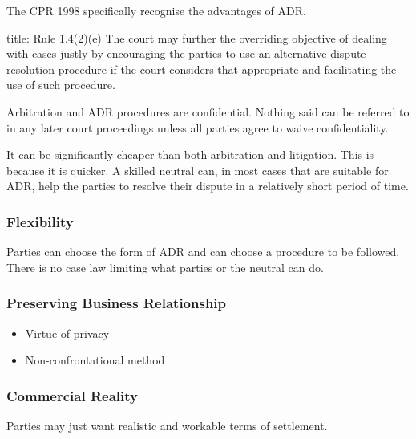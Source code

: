 \documentclass[
]{article}
\newenvironment{Shaded}{}{}
\newcommand{\NormalTok}[1]{#1}
\providecommand{\tightlist}{%
  \setlength{\itemsep}{0pt}\setlength{\parskip}{0pt}}
\begin{document}
The CPR 1998 specifically recognise the advantages of ADR.

\begin{Shaded}
\begin{Highlighting}[]
\NormalTok{title: Rule 1.4(2)(e)}
\NormalTok{The court may further the overriding objective of dealing with cases justly by encouraging the parties to use an alternative dispute resolution procedure if the court considers that appropriate and facilitating the use of such procedure.}
\end{Highlighting}
\end{Shaded}

Arbitration and ADR procedures are confidential. Nothing said can be
referred to in any later court proceedings unless all parties agree to
waive confidentiality.

It can be significantly cheaper than both arbitration and litigation.
This is because it is quicker. A skilled neutral can, in most cases that
are suitable for ADR, help the parties to resolve their dispute in a
relatively short period of time.

\hypertarget{flexibility}{%
\subsubsection{Flexibility}\label{flexibility}}

Parties can choose the form of ADR and can choose a procedure to be
followed. There is no case law limiting what parties or the neutral can
do.

\hypertarget{preserving-business-relationship}{%
\subsubsection{Preserving Business
Relationship}\label{preserving-business-relationship}}

\begin{itemize}
\tightlist
\item
  Virtue of privacy
\item
  Non-confrontational method
\end{itemize}

\hypertarget{commercial-reality}{%
\subsubsection{Commercial Reality}\label{commercial-reality}}

Parties may just want realistic and workable terms of settlement.
\end{document}

